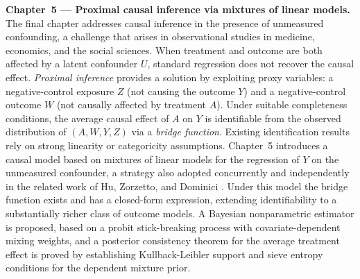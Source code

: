\medskip
\noindent\textbf{Chapter~5 --- Proximal causal inference via mixtures of linear models.}
The final chapter addresses causal inference in the presence of unmeasured confounding, a challenge that arises in observational studies in medicine, economics, and the social sciences. When treatment and outcome are both affected by a latent confounder $U$, standard regression does not recover the causal effect. \textit{Proximal inference} \cite{205,120} provides a solution by exploiting proxy variables: a negative-control exposure $Z$ (not causing the outcome $Y$) and a negative-control outcome $W$ (not causally affected by treatment $A$). Under suitable completeness conditions, the average causal effect of $A$ on $Y$ is identifiable from the observed distribution of $(A,W,Y,Z)$ via a \textit{bridge function}. Existing identification results rely on strong linearity or categoricity assumptions. Chapter~5 introduces a causal model based on mixtures of linear models for the regression of $Y$ on the unmeasured confounder, a strategy also adopted concurrently and independently in the related work of Hu, Zorzetto, and Dominici \cite{209}. Under this model the bridge function exists and has a closed-form expression, extending identifiability to a substantially richer class of outcome models. A Bayesian nonparametric estimator is proposed, based on a probit stick-breaking process with covariate-dependent mixing weights, and a posterior consistency theorem for the average treatment effect is proved by establishing Kullback-Leibler support and sieve entropy conditions for the dependent mixture prior.

